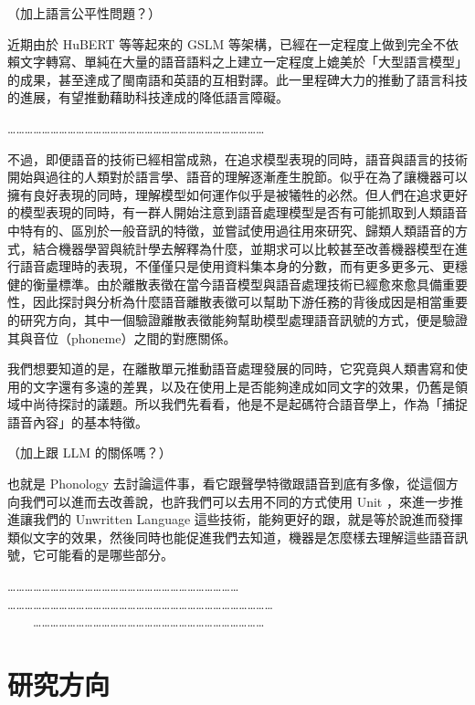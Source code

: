     （加上語言公平性問題？）

    近期由於 HuBERT 等等起來的 GSLM 等架構，已經在一定程度上做到完全不依賴文字轉寫、單純在大量的語音語料之上建立一定程度上媲美於「大型語言模型」的成果，甚至達成了閩南語和英語的互相對譯。此一里程碑大力的推動了語言科技的進展，有望推動藉助科技達成的降低語言障礙。

    ………………………………………………………………………………

    
    
   不過，即便語音的技術已經相當成熟，在追求模型表現的同時，語音與語言的技術開始與過往的人類對於語言學、語音的理解逐漸產生脫節。似乎在為了讓機器可以擁有良好表現的同時，理解模型如何運作似乎是被犧牲的必然。但人們在追求更好的模型表現的同時，有一群人開始注意到語音處理模型是否有可能抓取到人類語音中特有的、區別於一般音訊的特徵，並嘗試使用過往用來研究、歸類人類語音的方式，結合機器學習與統計學去解釋為什麼，並期求可以比較甚至改善機器模型在進行語音處理時的表現，不僅僅只是使用資料集本身的分數，而有更多更多元、更穩健的衡量標準。由於離散表徵在當今語音模型與語音處理技術已經愈來愈具備重要性，因此探討與分析為什麼語音離散表徵可以幫助下游任務的背後成因是相當重要的研究方向，其中一個驗證離散表徵能夠幫助模型處理語音訊號的方式，便是驗證其與音位（phoneme）之間的對應關係。

    我們想要知道的是，在離散單元推動語音處理發展的同時，它究竟與人類書寫和使用的文字還有多遠的差異，以及在使用上是否能夠達成如同文字的效果，仍舊是領域中尚待探討的議題。所以我們先看看，他是不是起碼符合語音學上，作為「捕捉語音內容」的基本特徵。

    （加上跟 LLM 的關係嗎？）

    也就是 Phonology 去討論這件事，看它跟聲學特徵跟語音到底有多像，從這個方向我們可以進而去改善說，也許我們可以去用不同的方式使用 Unit ，來進一步推進讓我們的 Unwritten Language 這些技術，能夠更好的跟，就是等於說進而發揮類似文字的效果，然後同時也能促進我們去知道，機器是怎麼樣去理解這些語音訊號，它可能看的是哪些部分。

    ……………………………………………………………………… \\
    ………………………………………………………………………………… \\
　　………………………………………………………………………


\section{研究方向}  %


